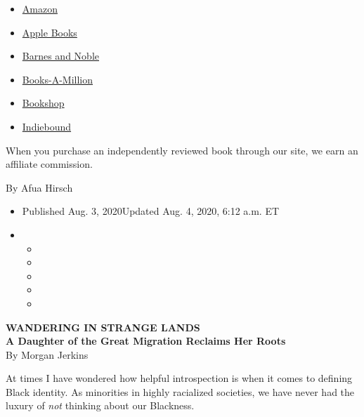 \begin{itemize}
\tightlist
\item
  \href{https://www.amazon.com/gp/search?index=books\&tag=NYTBSREV-20\&field-keywords=Wandering+in+Strange+Lands\%3A+A+Daughter+of+the+Great+Migration+Reclaims+Her+Roots+Morgan+Jerkins}{Amazon}
\item
  \href{https://du-gae-books-dot-nyt-du-prd.appspot.com/buy?title=Wandering+in+Strange+Lands\%3A+A+Daughter+of+the+Great+Migration+Reclaims+Her+Roots\&author=Morgan+Jerkins}{Apple
  Books}
\item
  \href{https://www.anrdoezrs.net/click-7990613-11819508?url=https\%3A\%2F\%2Fwww.barnesandnoble.com\%2Fw\%2F\%3Fean\%3D9780062873040}{Barnes
  and Noble}
\item
  \href{https://www.anrdoezrs.net/click-7990613-35140?url=https\%3A\%2F\%2Fwww.booksamillion.com\%2Fp\%2FWandering\%2Bin\%2BStrange\%2BLands\%253A\%2BA\%2BDaughter\%2Bof\%2Bthe\%2BGreat\%2BMigration\%2BReclaims\%2BHer\%2BRoots\%2FMorgan\%2BJerkins\%2F9780062873040}{Books-A-Million}
\item
  \href{https://bookshop.org/a/3546/9780062873040}{Bookshop}
\item
  \href{https://www.indiebound.org/book/9780062873040?aff=NYT}{Indiebound}
\end{itemize}

When you purchase an independently reviewed book through our site, we
earn an affiliate commission.

By Afua Hirsch

\begin{itemize}
\item
  Published Aug. 3, 2020Updated Aug. 4, 2020, 6:12 a.m. ET
\item
  \begin{itemize}
  \item
  \item
  \item
  \item
  \item
  \end{itemize}
\end{itemize}

\textbf{WANDERING IN STRANGE LANDS}\\
\textbf{A Daughter of the Great Migration Reclaims Her Roots}\\
By Morgan Jerkins

At times I have wondered how helpful introspection is when it comes to
defining Black identity. As minorities in highly racialized societies,
we have never had the luxury of \emph{not} thinking about our Blackness.

